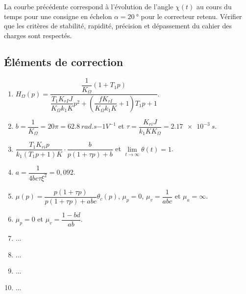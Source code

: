 \begin{multicols}{2}
La courbe précédente %
correspond à l'évolution de l'angle $\chi(t)$ au cours du temps pour une consigne en échelon $\alpha=\SI{20}{\degree}$ pour le correcteur retenu. Vérifier que les critères de stabilité, rapidité, précision et dépassement du cahier des charges sont respectés.










\subsection*{Éléments de correction}
\begin{enumerate}
\item $H_{\Omega}(p)=\dfrac{\dfrac{1}{K_{\Omega}}\left( 1 + T_{1}p \right)}{\dfrac{T_{1} K_{rI}J}{K_{\Omega}k_{1}K}p^2+\left(\dfrac{f K_{rI}}{K_{\Omega}k_{1}K}+1\right)T_{1}p + 1 }$.
\item  $b=\dfrac{1}{K_{\Omega}} = 20 \pi = \SI{62,8}{rad.s{-1}V^{-1}}$ et $\tau=\dfrac{K_{ri}J}{k_1KK_{\Omega}}=\SI{2,17e-3}{s}$.
\item $\dfrac{T_{1}K_{ri}p}{ k_{1}\left( T_{1}p + 1 \right)K}\cdot \dfrac{b}{p\left(1+\tau p \right)+b}$ et $\lim\limits_{t\to\infty} \theta(t) = 1$.
\item  ${a}=\dfrac{1}{4bc\tau\xi^2}=0,092$.
\item $\mu(p)=\dfrac{p\left( 1+\tau p\right)}{p\left( 1+\tau p\right)+abc}\theta_c(p)$, $\mu_p = 0$, $\mu_v = \dfrac{1}{abc}$ et  $\mu_a = \infty$.
\item $\mu_p=0$ et $\mu_v= \dfrac{1 -bd}{ab}$.
\item ...
\item ...
\item ...
\item ...
\end{enumerate}
\end{multicols}

%

%
%
%
%
